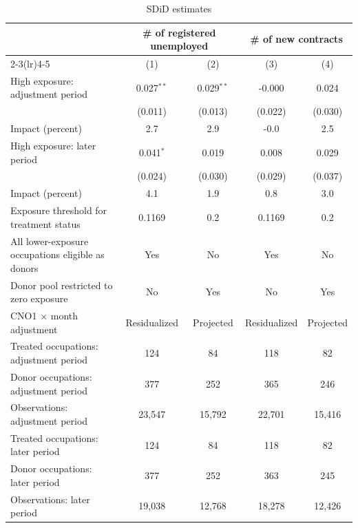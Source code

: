 \begin{table}[H]
\centering
\caption{SDiD estimates}
\label{tab:v1_sdid}
\begin{threeparttable}
\small
\setlength{\tabcolsep}{4pt}
\begin{tabular}{lcccc}
\toprule
& \multicolumn{2}{c}{\# of registered unemployed} & \multicolumn{2}{c}{\# of new contracts} \\
\cmidrule(lr){2-3}\cmidrule(lr){4-5}
& (1) & (2) & (3) & (4) \\
\midrule
High exposure: adjustment period & 0.027$^{**}$ & 0.029$^{**}$ & -0.000 & 0.024 \\
 & (0.011) & (0.013) & (0.022) & (0.030) \\
Impact (percent) & 2.7 & 2.9 & -0.0 & 2.5 \\
\addlinespace
High exposure: later period & 0.041$^{*}$ & 0.019 & 0.008 & 0.029 \\
 & (0.024) & (0.030) & (0.029) & (0.037) \\
Impact (percent) & 4.1 & 1.9 & 0.8 & 3.0 \\
\midrule
Exposure threshold for treatment status & 0.1169 & 0.2 & 0.1169 & 0.2 \\
All lower-exposure occupations eligible as donors & Yes & No & Yes & No \\
Donor pool restricted to zero exposure & No & Yes & No & Yes \\
CNO1 $\times$ month adjustment & Residualized & Projected & Residualized & Projected \\
Treated occupations: adjustment period & 124 & 84 & 118 & 82 \\
Donor occupations: adjustment period & 377 & 252 & 365 & 246 \\
Observations: adjustment period & 23,547 & 15,792 & 22,701 & 15,416 \\
Treated occupations: later period & 124 & 84 & 118 & 82 \\
Donor occupations: later period & 377 & 252 & 363 & 245 \\
Observations: later period & 19,038 & 12,768 & 18,278 & 12,426 \\
\bottomrule
\end{tabular}
\begin{tablenotes}[flushleft]
\footnotesize

\end{tablenotes}
\end{threeparttable}
\end{table}

